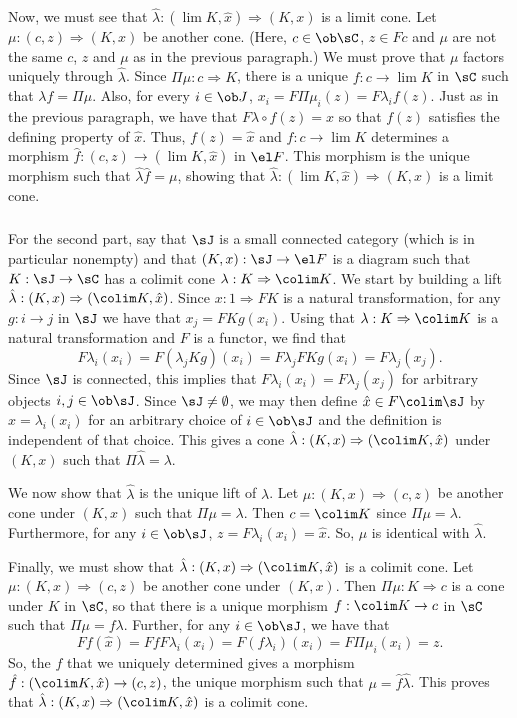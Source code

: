 \documentclass[main.tex]{subfiles}
\begin{document}
Now, we must see that $\hat{\lambda}:(\lim K,\hat{x})\Rightarrow(K,x)$ is a
limit cone. Let $\mu:(c,z)\Rightarrow(K,x)$ be another cone. (Here,
$c\in\ob\sC$, $z\in Fc$ and $\mu$ are not the same $c$, $z$ and $\mu$ as in the
previous paragraph.) We must prove that $\mu$ factors uniquely through
$\hat{\lambda}$. Since $\Pi\mu:c\Rightarrow K$, there is a unique
$f:c\rightarrow\lim K$ in $\sC$ such  that $\lambda f=\Pi\mu$. Also, for every
$i\in\ob J$, $x_i=F\Pi\mu_i(z)=F\lambda_i f(z)$. Just as in the previous
paragraph, we have that $F\lambda\circ f(z)=x$ so that $f(z)$ satisfies the
defining property of $\hat{x}$. Thus, $f(z)=\hat{x}$ and $f:c\rightarrow\lim K$
determines a morphism $\hat{f}:(c,z)\rightarrow(\lim K,\hat{x})$ in $\el F$.
This morphism is the unique morphism such that $\hat{\lambda}\hat{f}=\mu$,
showing that $\hat{\lambda}:(\lim K,\hat{x})\Rightarrow(K,x)$ is a limit cone.

\subparagraph{}
For the second part, say that $\sJ$ is a small connected category (which is in particular nonempty) and that $(K,x):\sJ\rightarrow\el F$ is a diagram such that $K:\sJ\rightarrow\sC$ has a colimit cone $\lambda:K\Rightarrow\colim K$. We start by building a lift $\hat\lambda:(K,x)\Rightarrow(\colim K,\hat x)$. Since $x:1\Rightarrow FK$ is a natural transformation, for any $g:i\rightarrow j$ in $\sJ$ we have that $x_j=FKg(x_i)$. Using that $\lambda:K\Rightarrow\colim K$ is a natural transformation and $F$ is a functor, we find that
\[F\lambda_i(x_i)=F(\lambda_jKg)(x_i)=F\lambda_jFKg(x_i)=F\lambda_j(x_j).\]
Since $\sJ$ is connected, this implies that $F\lambda_i(x_i)=F\lambda_j(x_j)$ for arbitrary objects $i,j\in\ob\sJ$. Since $\sJ\ne\emptyset$, we may then define $\hat{x}\in F\colim\sJ$ by $\hat{x}=\lambda_i(x_i)$ for an arbitrary choice of $i\in\ob\sJ$ and the definition is independent of that choice. This gives a cone $\hat{\lambda}:(K,x)\Rightarrow(\colim K,\hat x)$ under $(K,x)$ such that $\Pi\hat{\lambda}=\lambda$.

We now show that $\hat{\lambda}$ is the unique lift of $\lambda$. Let
$\mu:(K,x)\Rightarrow(c,z)$ be another cone under $(K,x)$ such that
$\Pi\mu=\lambda$. Then $c=\colim K$ since $\Pi\mu=\lambda$. Furthermore, for any
$i\in\ob\sJ$, $z=F\lambda_i(x_i)=\hat{x}$. So, $\mu$ is identical with
$\hat\lambda$.

Finally, we must show that $\hat\lambda:(K,x)\Rightarrow(\colim K,\hat x)$ is a colimit cone. Let $\mu:(K,x)\Rightarrow(c,z)$ be another cone under $(K,x)$. Then $\Pi\mu:K\Rightarrow c$ is a cone under $K$ in $\sC$, so that there is a unique morphism $f:\colim K\rightarrow c$ in $\sC$ such that $\Pi\mu=f\lambda$. Further, for any $i\in\ob\sJ$, we have that
\[Ff(\hat{x})=FfF\lambda_i(x_i)=F(f\lambda_i)(x_i)=F\Pi\mu_i(x_i)=z.\]
So, the $f$ that we uniquely determined gives a morphism $\hat f:(\colim K,\hat x)\rightarrow(c,z)$, the unique morphism such that $\mu=\hat f\hat\lambda$. This proves that $\hat{\lambda}:(K,x)\Rightarrow(\colim K,\hat x)$ is a colimit cone.
\end{document}
